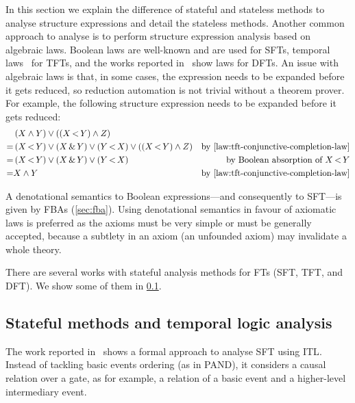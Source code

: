\documentclass[12pt,openright,twoside,a4paper,oldfontcommands,english,brazil,final]{abntex2}
\theoremstyle{theo}
\newcommand{\parsin}[1]{\ensuremath\left( #1 \right)}
\def\pand{\ensuremath\operatorname{<}}
\def\sand{\ensuremath\operatorname{\&}}
\begin{document}
In this section we explain the difference of stateful and stateless methods to analyse structure expressions and detail the stateless methods.
Another common approach to analyse  is to perform structure expression analysis based on algebraic laws.
Boolean laws are well-known and are used for \acp{SFT}, temporal laws~\cite{Walker2009,WP2010} for \acp{TFT}, and the works reported in~\cite{Merle2010,MRL2011} show laws for \acp{DFT}.
An issue with algebraic laws is that, in some cases, the expression needs to be expanded before it gets reduced, so reduction automation is not trivial without a theorem prover.
For example, the following  structure expression needs to be expanded \cite{WP2010} before it gets reduced:
\begin{align*}
  & \parsin{X \land Y} \lor \parsin{\parsin{X \pand Y} \land Z} &\\
  = & \parsin{X \pand Y} \lor \parsin{X \sand Y} \lor \parsin{Y \pand X} \lor \parsin{\parsin{X \pand Y} \land Z} & \text{by \cref{law:tft-conjunctive-completion-law}}\\
  = & \parsin{X \pand Y} \lor \parsin{X \sand Y} \lor \parsin{Y \pand X} & \text{by Boolean absorption of } X \pand Y\\
  = & X \land Y & \text{by \cref{law:tft-conjunctive-completion-law}}
\end{align*}

A denotational semantics to Boolean expressions---and consequently to \ac{SFT}---is given by \acp{FBA} (\cref{sec:fba}).
Using denotational semantics in favour of axiomatic laws is preferred as the axioms must be very simple or must be generally accepted, because a subtlety in an axiom (an unfounded axiom) may invalidate a whole theory.

There are several works with stateful analysis methods for \acp{FT} (\ac{SFT}, \ac{TFT}, and \ac{DFT}).
We show some of them in \cref{sec:ft-stateful-analysis-methods}.

\subsection{Stateful methods and temporal logic analysis}
\label{sec:ft-stateful-analysis-methods}

The work reported in~\cite{STR2002} shows a formal approach to analyse \ac{SFT} using \ac{ITL}.
Instead of tackling basic events ordering (as in \ac{PAND}), it considers a causal relation over a gate, as for example, a relation of a basic event and a higher-level intermediary event.
\end{document}
